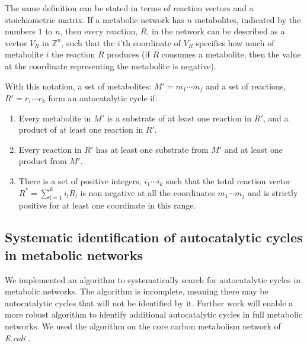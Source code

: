 The same definition can be stated in terms of reaction vectors and a stoichiometric matrix.
If a metabolic network has $n$ metabolites, indicated by the numbers $1$ to $n$, then every reaction, $R$, in the network can be described as a vector $V_R$ in $\mathbb{Z}^n$, such that the $i$'th coordinate of $V_R$ specifies how much of metabolite $i$ the reaction $R$ produces (if $R$ consumes a metabolite, then the value at the coordinate representing the metabolite is negative).

With this notation, a set of metabolites: $M'={m_1\cdots m_j}$ and a set of reactions, $R'={r_1\cdots r_k}$ form an autocatalytic cycle if:
\begin{enumerate}
    \item Every metabolite in $M'$ is a substrate of at least one reaction in $R'$, and a product of at least one reaction in $R'$.
    \item Every reaction in $R'$ has at least one substrate from $M'$ and at least one product from $M'$.
    \item There is a set of positive integers, $i_1\cdots i_k$ such that the total reaction vector $R^*=\sum_{l=1}^k i_lR_l$ is non negative at all the coordinates $m_1\cdots m_j$ and is strictly positive for at least one coordinate in this range.
\end{enumerate}

  \subsection{Systematic identification of autocatalytic cycles in metabolic networks}
  We implemented an algorithm to systematically search for autocatalytic cycles in metabolic networks.
  The algorithm is incomplete, meaning there may be autocatalytic cycles that will not be identified by it.
  Further work will enable a more robust algorithm to identify additional autocatalytic cycles in full metabolic networks.
  We used the algorithm on the core carbon metabolism network of \emph{E.coli} \cite{Orth2010-vl}.

